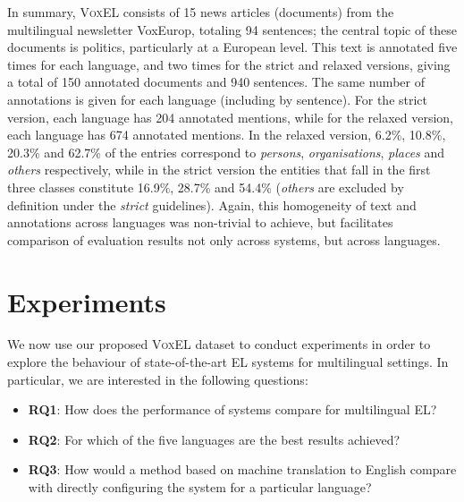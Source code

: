 \documentclass{llncs}
\begin{document}
In summary, \textsc{VoxEL} consists of 15 news articles (documents) from the multilingual newsletter VoxEurop, totaling 94 sentences; the central topic of these documents is politics, particularly at a European level. This text is annotated five times for each language, and two times for the strict and relaxed versions, giving a total of 150 annotated documents and 940 sentences. The same number of annotations is given for each language (including by sentence). For the strict version, each language has 204 annotated mentions, while for the relaxed version, each language has 674 annotated mentions. In the relaxed version, 6.2\%, 10.8\%, 20.3\% and 62.7\% of the entries correspond to \textit{persons}, \textit{organisations}, \textit{places} and \textit{others} respectively, while in the strict version the entities that fall in the first three classes constitute 16.9\%, 28.7\% and 54.4\% (\textit{others} are excluded by definition under the \textit{strict} guidelines). Again, this homogeneity of text and annotations across languages was non-trivial to achieve, but facilitates comparison of evaluation results not only across systems, but across languages. %

\section{Experiments}\label{sec:exp}

We now use our proposed \textsc{VoxEL} dataset to conduct experiments in order to explore the behaviour of state-of-the-art EL systems for multilingual settings. In particular, we are interested in the following questions:

\begin{itemize}
\item \textbf{RQ1}: How does the performance of systems compare for multilingual EL?
\item \textbf{RQ2}: For which of the five languages are the best results achieved?
\item \textbf{RQ3}: How would a method based on machine translation to English compare with directly configuring the system for a particular language?
\end{itemize}
\end{document}
